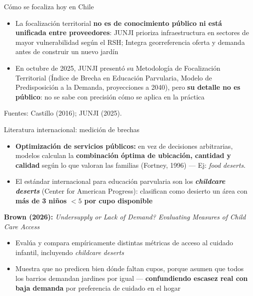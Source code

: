 \documentclass[aspectratio=169,10pt]{beamer}
\newcommand{\fuentes}[1]{%
  \vfill{\color{graytext}\scriptsize Fuentes: #1.}%
}
\newcommand{\destacar}[1]{\textcolor{steel}{\textbf{#1}}}
\begin{document}
\begin{frame}{Cómo se focaliza hoy en Chile}
  \small
  \begin{itemize}
    \item La focalización territorial \destacar{no es de conocimiento público ni está unificada entre proveedores}: JUNJI prioriza infraestructura en sectores de mayor vulnerabilidad según el RSH; Integra georreferencia oferta y demanda antes de construir un nuevo jardín
    \item En octubre de 2025, JUNJI presentó su Metodología de Focalización Territorial (Índice de Brecha en Educación Parvularia, Modelo de Predisposición a la Demanda, proyecciones a 2040), pero \destacar{su detalle no es público}: no se sabe con precisión cómo se aplica en la práctica
  \end{itemize}
  \fuentes{Castillo (2016); JUNJI (2025)}
\end{frame}

\begin{frame}{Literatura internacional: medición de brechas}
  \small
  \begin{itemize}[itemsep=4pt,topsep=2pt]
    \item \textbf{Optimización de servicios públicos:} en vez de decisiones arbitrarias, modelos calculan la \destacar{combinación óptima de ubicación, cantidad y calidad} según lo que valoran las familias (Fortney, 1996) --- Ej: \textit{food deserts}.
    \item El estándar internacional para educación parvularia son los \destacar{\textit{childcare deserts}} (Center for American Progress): clasifican como desierto un área con \destacar{más de 3 niños $<5$ por cupo disponible}
  \end{itemize}
  \vspace{6pt}
  {\setlength{\fboxsep}{3pt}\colorbox{steellight!30}{\textbf{Brown (2026):} {\itshape Undersupply or Lack of Demand? Evaluating Measures of Child Care Access}}}
  \begin{itemize}[itemsep=3pt,topsep=3pt]
    \item Evalúa y compara empíricamente distintas métricas de acceso al cuidado infantil, incluyendo \textit{childcare deserts}
    \item Muestra que no predicen bien dónde faltan cupos, porque asumen que todos los barrios demandan jardines por igual --- \destacar{confundiendo escasez real con baja demanda} por preferencia de cuidado en el hogar
  \end{itemize}
\end{frame}
\end{document}
